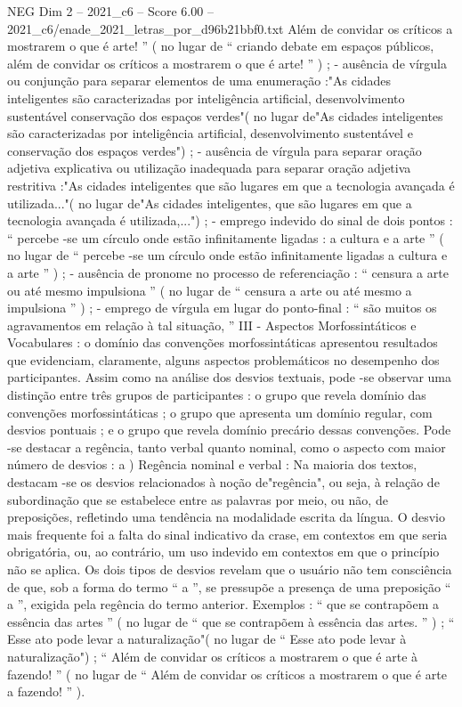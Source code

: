 \begin{textsample}{NEG Dim 2 – 2021\_c6 – Score 6.00 – 2021\_c6/enade\_2021\_letras\_por\_d96b21bbf0.txt}
Além de convidar os críticos a mostrarem o que é arte! ” ( no lugar de “ criando debate em espaços públicos, além de convidar os críticos a mostrarem o que é arte! ” ) ; - ausência de vírgula ou conjunção para separar elementos de uma enumeração :"As cidades inteligentes são caracterizadas por inteligência artificial, desenvolvimento sustentável conservação dos espaços verdes"( no lugar de"As cidades inteligentes são caracterizadas por inteligência artificial, desenvolvimento sustentável e conservação dos espaços verdes") ; - ausência de vírgula para separar oração adjetiva explicativa ou utilização inadequada para separar oração adjetiva restritiva :"As cidades inteligentes que são lugares em que a tecnologia avançada é utilizada..."( no lugar de"As cidades inteligentes, que são lugares em que a tecnologia avançada é utilizada,...") ; - emprego indevido do sinal de dois pontos : “ percebe -se um círculo onde estão infinitamente ligadas : a cultura e a arte ” ( no lugar de “ percebe -se um círculo onde estão infinitamente ligadas a cultura e a arte ” ) ; - ausência de pronome no processo de referenciação : “ censura a arte ou até mesmo impulsiona ” ( no lugar de “ censura a arte ou até mesmo a impulsiona ” ) ; - emprego de vírgula em lugar do ponto-final : “ são muitos os agravamentos em relação à tal situação, ” III - Aspectos Morfossintáticos e Vocabulares : o domínio das convenções morfossintáticas apresentou resultados que evidenciam, claramente, alguns aspectos problemáticos no desempenho dos participantes.
Assim como na análise dos desvios textuais, pode -se observar uma distinção entre três grupos de participantes : o grupo que revela domínio das convenções morfossintáticas ; o grupo que apresenta um domínio regular, com desvios pontuais ; e o grupo que revela domínio precário dessas convenções.
Pode -se destacar a regência, tanto verbal quanto nominal, como o aspecto com maior número de desvios : a ) Regência nominal e verbal : Na maioria dos textos, destacam -se os desvios relacionados à noção de"regência", ou seja, à relação de subordinação que se estabelece entre as palavras por meio, ou não, de preposições, refletindo uma tendência na modalidade escrita da língua.
O desvio mais frequente foi a falta do sinal indicativo da crase, em contextos em que seria obrigatória, ou, ao contrário, um uso indevido em contextos em que o princípio não se aplica.
Os dois tipos de desvios revelam que o usuário não tem consciência de que, sob a forma do termo “ a ”, se pressupõe a presença de uma preposição “ a ”, exigida pela regência do termo anterior.
Exemplos : “ que se contrapõem a essência das artes ” ( no lugar de “ que se contrapõem à essência das artes. ” ) ; “ Esse ato pode levar a naturalização"( no lugar de “ Esse ato pode levar à naturalização") ; “ Além de convidar os críticos a mostrarem o que é arte à fazendo! ” ( no lugar de “ Além de convidar os críticos a mostrarem o que é arte a fazendo! ” ).

\end{textsample}
